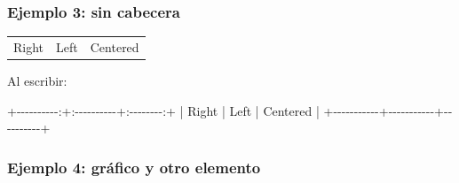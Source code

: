 \documentclass[
  letterpaper,
  DIV=11,
  numbers=noendperiod]{scrartcl}
\newenvironment{Shaded}{\begin{snugshade}}{\end{snugshade}}
\newcommand{\NormalTok}[1]{\textcolor[rgb]{0.00,0.23,0.31}{#1}}
\begin{document}
\subsubsection{Ejemplo 3: sin cabecera}\label{ejemplo-3-sin-cabecera}

\begin{longtable}[]{@{}
  >{\raggedleft\arraybackslash}p{}
  >{\raggedright\arraybackslash}p{}
  >{\centering\arraybackslash}p{}@{}}
\toprule\noalign{}
\endhead
\bottomrule\noalign{}
\endlastfoot
Right & Left & Centered \\
\end{longtable}

Al escribir:

\begin{Shaded}
\begin{Highlighting}[]
\NormalTok{+{-}{-}{-}{-}{-}{-}{-}{-}{-}{-}:+:{-}{-}{-}{-}{-}{-}{-}{-}{-}{-}+:{-}{-}{-}{-}{-}{-}{-}{-}:+}
\NormalTok{| Right     | Left      | Centered |}
\NormalTok{+{-}{-}{-}{-}{-}{-}{-}{-}{-}{-}{-}+{-}{-}{-}{-}{-}{-}{-}{-}{-}{-}{-}+{-}{-}{-}{-}{-}{-}{-}{-}{-}{-}+}
\end{Highlighting}
\end{Shaded}

\subsubsection{Ejemplo 4: gráfico y otro
elemento}\label{ejemplo-4-gruxe1fico-y-otro-elemento}
\end{document}
